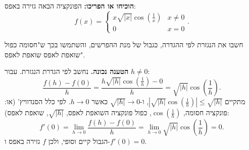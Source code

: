 
\begin{question}
\textbf{הוכיחו או הפריכו:} הפונקציה הבאה גזירה באפס:
\[ f(x)=\begin{cases} x\sqrt{|x|}\cos(\frac{1}{x}) & x\neq 0\\ 0 & x=0\end{cases}. \]
\end{question}

\begin{hint}
חשבו את הנגזרת לפי ההגדרה, כגבול של מנת ההפרשים, והשתמשו בכך ש"חסומה כפול שואפת לאפס שואפת לאפס".
\end{hint}

\begin{solution}
\textbf{הטענה נכונה.} נחשב לפי הגדרת הנגזרת. עבור $h\neq 0$:
\[ \frac{f(h)-f(0)}{h}=\frac{h\sqrt{|h|}\cos(\frac1h)-0}{h}=\sqrt{|h|}\cos\!\left(\frac1h\right). \]
מתקיים $\left|\sqrt{|h|}\cos(\frac1h)\right|\le \sqrt{|h|}$, ו-$\sqrt{|h|}\to 0$ כאשר $h\to 0$. לפי כלל הסנדוויץ' (או: פונקציה חסומה, $\cos(\frac1h)$, כפול פונקציה השואפת לאפס, $\sqrt{|h|}$, שואפת לאפס):
\[ f'(0)=\lim_{h\to 0}\frac{f(h)-f(0)}{h}=\lim_{h\to0}\sqrt{|h|}\cos\!\left(\frac1h\right)=0. \]
הגבול קיים וסופי, ולכן $f$ גזירה באפס ו-$\boxed{f'(0)=0}$.
\end{solution}
